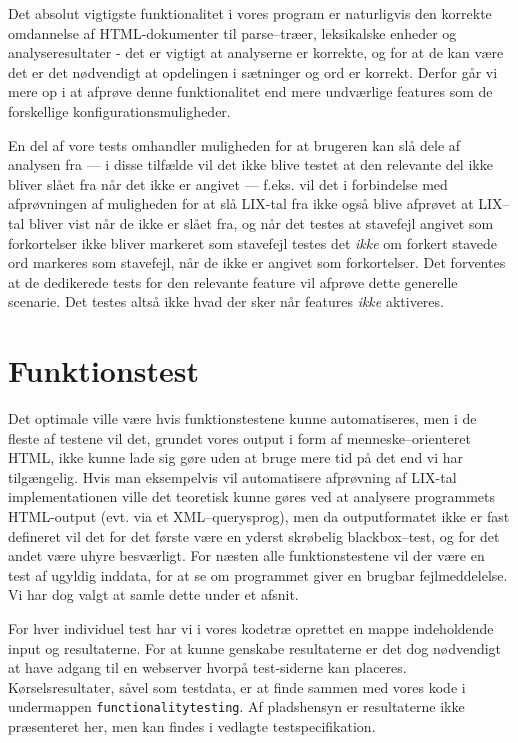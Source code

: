 \documentclass[a4paper,oneside]{memoir}
\begin{document}
Det absolut vigtigste funktionalitet i vores program er naturligvis
den korrekte omdannelse af HTML-dokumenter til parse--træer,
leksikalske enheder og analyseresultater - det er vigtigt at
analyserne er korrekte, og for at de kan være det er det nødvendigt at
opdelingen i sætninger og ord er korrekt. Derfor går vi mere op i at
afprøve denne funktionalitet end mere undværlige features som de
forskellige konfigurationsmuligheder.

En del af vore tests omhandler muligheden for at brugeren kan slå dele
af analysen fra --- i disse tilfælde vil det ikke blive testet at den
relevante del ikke bliver slået fra når det ikke er angivet ---
f.eks. vil det i forbindelse med afprøvningen af muligheden for at slå
LIX-tal fra ikke også blive afprøvet at LIX--tal bliver vist når de
ikke er slået fra, og når det testes at stavefejl angivet som
forkortelser ikke bliver markeret som stavefejl testes det
\textit{ikke} om forkert stavede ord markeres som stavefejl, når de
ikke er angivet som forkortelser. Det forventes at de dedikerede tests
for den relevante feature vil afprøve dette generelle scenarie. Det
testes altså ikke hvad der sker når features \textit{ikke} aktiveres.

\section{Funktionstest}
\label{funktionstests}
Det optimale ville være hvis funktionstestene kunne automatiseres, men
i de fleste af testene vil det, grundet vores output i form af
menneske--orienteret HTML, ikke kunne lade sig gøre uden at bruge mere
tid på det end vi har tilgængelig. Hvis man eksempelvis vil
automatisere afprøvning af LIX-tal implementationen ville det
teoretisk kunne gøres ved at analysere programmets HTML-output
(evt. via et XML--querysprog), men da outputformatet ikke er fast
defineret vil det for det første være en yderst skrøbelig
blackbox--test, og for det andet være uhyre besværligt. For næsten
alle funktionstestene vil der være en test af ugyldig inddata, for at
se om programmet giver en brugbar fejlmeddelelse. Vi har dog valgt at
samle dette under et afsnit.

For hver individuel test har vi i vores kodetræ oprettet en mappe
indeholdende input og resultaterne. For at kunne genskabe resultaterne
er det dog nødvendigt at have adgang til en webserver hvorpå
test-siderne kan placeres. Kørselsresultater, såvel som testdata, er
at finde sammen med vores kode i undermappen
\texttt{functionalitytesting}. Af pladshensyn er resultaterne ikke
præsenteret her, men kan findes i vedlagte testspecifikation.
\end{document}
